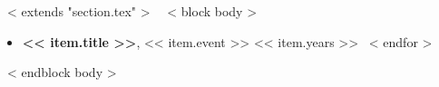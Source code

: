 \vspace{3mm}
~< extends "section.tex" >~
~< block body >~
\begin{itemize}
    ~< for item in items >~
    \item {\bf << item.title >>}, << item.event >> \hfill << item.years >>
    ~< endfor >~
\end{itemize}
~< endblock body >~

